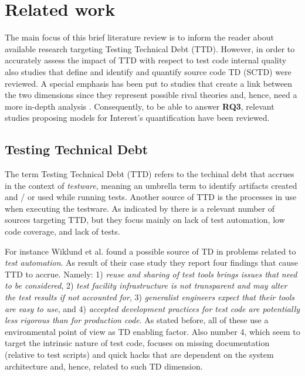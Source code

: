 \chapter{Related work} \label{sec:related_work}

The main focus of this brief literature review is to inform the reader about available research targeting Testing Technical Debt (TTD). However, in order to accurately assess the impact of TTD with respect to test code internal quality also studies that define and identify and quantify source code TD (SCTD) \cite{mapping_study_td} were reviewed. A special emphasis has been put to studies that create a link between the two dimensions since they represent possible rival theories and, hence, need a more in-depth analysis \cite{case_study_guide}. Consequently, to be able to answer \textbf{RQ3}, relevant studies proposing models for Interest's quantification have been reviewed.

\section{Testing Technical Debt} \label{testing_td}

The term Testing Technical Debt (TTD) refers to the techinal debt that accrues in the context of \textit{testware}, meaning an umbrella term to identify artifacts created and / or used while running tests. Another source of TTD is the processes in use when executing the testware. As indicated by \cite{mapping_study_td, exploration_of_td, exploration_of_td2} there is a relevant number of sources targeting TTD, but they focus mainly on lack of test automation, low code coverage, and lack of tests.

For instance Wiklund et al. \cite{test_automation_td} found a possible source of TD in problems related to \textit{test automation}. As result of their case study they report four findings that cause TTD to accrue. Namely: 1) \textit{reuse and sharing of test tools brings issues that need to be considered}, 2) \textit{test facility infrastructure is not transparent and may alter the test results if not accounted for}, 3) \textit{generalist engineers expect that their tools are easy to use}, and 4) \textit{accepted development practices for test code are potentially less rigorous than for production code}. As stated before, all of these use a environmental point of view as TD enabling factor. Also number 4, which seem to target the intrinsic nature of test code, focuses on missing documentation (relative to test scripts) and quick hacks that are dependent on the system architecture and, hence, related to such TD dimension. 

